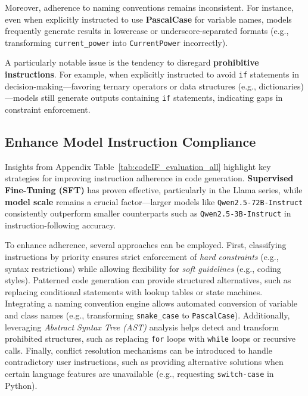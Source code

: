 Moreover, adherence to naming conventions remains inconsistent. For instance, even when explicitly instructed to use \textbf{PascalCase} for variable names, models frequently generate results in lowercase or underscore-separated formats (e.g., transforming \texttt{current\_power} into \texttt{CurrentPower} incorrectly).

A particularly notable issue is the tendency to disregard \textbf{prohibitive instructions}. For example, when explicitly instructed to avoid \texttt{if} statements in decision-making—favoring ternary operators or data structures (e.g., dictionaries)—models still generate outputs containing \texttt{if} statements, indicating gaps in constraint enforcement.

\subsection{Enhance Model Instruction Compliance}

Insights from Appendix Table~\ref{tab:codeIF_evaluation_all} highlight key strategies for improving instruction adherence in code generation. \textbf{Supervised Fine-Tuning (SFT)} has proven effective, particularly in the Llama series, while \textbf{model scale} remains a crucial factor—larger models like \texttt{Qwen2.5-72B-Instruct} consistently outperform smaller counterparts such as \texttt{Qwen2.5-3B-Instruct} in instruction-following accuracy.

To enhance adherence, several approaches can be employed. First, classifying instructions by priority ensures strict enforcement of \textit{hard constraints} (e.g., syntax restrictions) while allowing flexibility for \textit{soft guidelines} (e.g., coding styles). Patterned code generation can provide structured alternatives, such as replacing conditional statements with lookup tables or state machines. Integrating a naming convention engine allows automated conversion of variable and class names (e.g., transforming \texttt{snake\_case} to \texttt{PascalCase}). Additionally, leveraging \textit{Abstract Syntax Tree (AST)} analysis helps detect and transform prohibited structures, such as replacing \texttt{for} loops with \texttt{while} loops or recursive calls. Finally, conflict resolution mechanisms can be introduced to handle contradictory user instructions, such as providing alternative solutions when certain language features are unavailable (e.g., requesting \texttt{switch-case} in Python).


